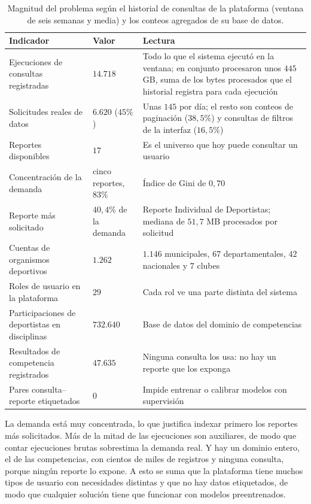 \documentclass[11pt,letterpaper]{article}
\numberwithin{equation}{section}
\begin{document}
\begin{table}[htbp]
\centering
\footnotesize
\setlength{\tabcolsep}{5pt}
\renewcommand{\arraystretch}{1.25}
\caption{Magnitud del problema según el historial de consultas de la plataforma (ventana de seis semanas y media) y los conteos agregados de su base de datos.}
\label{tab:magnitud}
\begin{tabularx}{\textwidth}{@{}Y l Y@{}}
\toprule
\textbf{Indicador} & \textbf{Valor} & \textbf{Lectura} \\
\midrule
Ejecuciones de consultas registradas & $14.718$ & Todo lo que el sistema ejecutó en la ventana; en conjunto procesaron unos $445$ GB, suma de los bytes procesados que el historial registra para cada ejecución \\
Solicitudes reales de datos & $6.620$ ($45\%$) & Unas $145$ por día; el resto son conteos de paginación ($38{,}5\%$) y consultas de filtros de la interfaz ($16{,}5\%$) \\
Reportes disponibles & $17$ & Es el universo que hoy puede consultar un usuario \\
Concentración de la demanda & cinco reportes, $83\%$ & Índice de Gini de $0{,}70$ \\
Reporte más solicitado & $40{,}4\%$ de la demanda & Reporte Individual de Deportistas; mediana de $51{,}7$ MB procesados por solicitud \\
Cuentas de organismos deportivos & $1.262$ & $1.146$ municipales, $67$ departamentales, $42$ nacionales y $7$ clubes \\
Roles de usuario en la plataforma & $29$ & Cada rol ve una parte distinta del sistema \\
Participaciones de deportistas en disciplinas & $732.640$ & Base de datos del dominio de competencias \\
Resultados de competencia registrados & $47.635$ & Ninguna consulta los usa: no hay un reporte que los exponga \\
Pares consulta--reporte etiquetados & $0$ & Impide entrenar o calibrar modelos con supervisión \\
\bottomrule
\end{tabularx}
\end{table}

La demanda está muy concentrada, lo que justifica indexar primero los reportes más solicitados. Más de la mitad de las ejecuciones son auxiliares, de modo que contar ejecuciones brutas sobrestima la demanda real. Y hay un dominio entero, el de las competencias, con cientos de miles de registros y ninguna consulta, porque ningún reporte lo expone. A esto se suma que la plataforma tiene muchos tipos de usuario con necesidades distintas y que no hay datos etiquetados, de modo que cualquier solución tiene que funcionar con modelos preentrenados.
\end{document}
